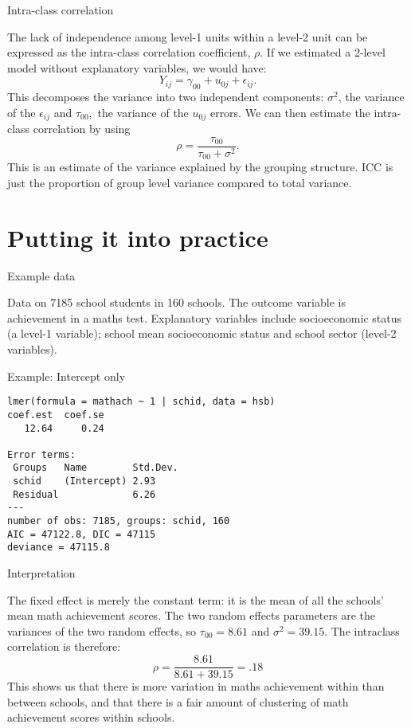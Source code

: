 \documentclass[10pt,ignorenonframetext,]{beamer}
\begin{document}
\begin{frame}{Intra-class correlation}

The lack of independence among level-1 units within a level-2 unit can
be expressed as the intra-class correlation coefficient, \(\rho\). If we
estimated a 2-level model without explanatory variables, we would have:
\[
Y_{ij} = \gamma_{00} + u_{0j} + \epsilon_{ij}.
\] This decomposes the variance into two independent components:
\(\sigma^2\), the variance of the \(\epsilon_{ij}\) and \(\tau_{00},\)
the variance of the \(u_{0j}\) errors. We can then estimate the
intra-class correlation by using \[
\rho = \frac{\tau_{00}}{\tau_{00} + \sigma^2}.
\] This is an estimate of the variance explained by the grouping
structure. ICC is just the proportion of group level variance compared
to total variance.

\end{frame}

\section{Putting it into practice}\label{putting-it-into-practice}

\begin{frame}{Example data}

Data on 7185 school students in 160 schools. The outcome variable is
achievement in a maths test. Explanatory variables include socioeconomic
status (a level-1 variable); school mean socioeconomic status and school
sector (level-2 variables).

\end{frame}

\begin{frame}[fragile]{Example: Intercept only}

\footnotesize

\begin{verbatim}
lmer(formula = mathach ~ 1 | schid, data = hsb)
coef.est  coef.se 
   12.64     0.24 

Error terms:
 Groups   Name        Std.Dev.
 schid    (Intercept) 2.93    
 Residual             6.26    
---
number of obs: 7185, groups: schid, 160
AIC = 47122.8, DIC = 47115
deviance = 47115.8 
\end{verbatim}

\end{frame}

\begin{frame}{Interpretation}

The fixed effect is merely the constant term: it is the mean of all the
schools' mean math achievement scores. The two random effects parameters
are the variances of the two random effects, so \(\tau_{00} = 8.61\) and
\(\sigma^2 = 39.15.\) The intraclass correlation is therefore: \[
\rho = \frac{8.61}{8.61 + 39.15} = .18
\] This shows us that there is more variation in maths achievement
within than between schools, and that there is a fair amount of
clustering of math achievement scores within schools.

\end{frame}
\end{document}
